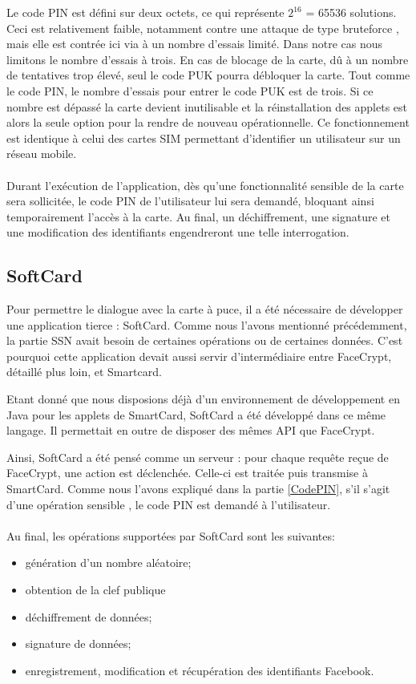 \documentclass[a4paper,11pt,french]{article}
\begin{document}
Le code PIN est défini sur deux octets, ce qui représente $2^{16}$ = 65536 solutions.
Ceci est relativement faible, notamment contre une attaque de type 
\og{}bruteforce \fg{}, mais elle est contrée ici via à un nombre d'essais limité.
Dans notre cas nous limitons le nombre d'essais à trois. En cas de blocage de la
carte, dû à un nombre de tentatives trop élevé, seul le code PUK pourra 
débloquer la carte. Tout comme le code PIN, le nombre d'essais pour entrer le 
code PUK est de trois. Si ce nombre est dépassé la carte devient inutilisable et
la réinstallation des applets est alors la seule option pour la rendre
de nouveau opérationnelle. Ce fonctionnement est identique à celui des cartes
 SIM permettant d'identifier un utilisateur sur un réseau mobile.

\paragraph{}
Durant l'exécution de l'application, dès qu'une fonctionnalité sensible de la 
carte sera sollicitée, le code PIN de l'utilisateur lui sera demandé, bloquant 
ainsi temporairement l'accès à la carte. Au final, un déchiffrement, une signature
et une modification des identifiants engendreront une telle interrogation.

\subsection{SoftCard}
Pour permettre le dialogue avec la carte à puce, il a été nécessaire de développer
une application tierce : SoftCard. Comme nous l'avons mentionné précédemment,
la partie SSN avait besoin de certaines opérations ou de certaines données. 
C'est pourquoi cette application devait aussi servir d'intermédiaire entre 
FaceCrypt, détaillé plus loin, et Smartcard.

Etant donné que nous disposions déjà d'un environnement de développement en Java
pour les applets de SmartCard, SoftCard a été développé dans ce même langage. Il
permettait en outre de disposer des mêmes API que FaceCrypt.

Ainsi, SoftCard a été pensé comme un serveur : pour chaque requête reçue de 
FaceCrypt, une action est déclenchée. Celle-ci est traitée puis transmise à
SmartCard. Comme nous l'avons expliqué dans la partie \ref{CodePIN}, s'il s'agit
d'une opération \og sensible \fg, le code PIN est demandé à l'utilisateur.

\paragraph{}
Au final, les opérations supportées par SoftCard sont les suivantes:  
\begin{itemize}
    \item génération d'un nombre aléatoire;
    \item obtention de la clef publique
    \item déchiffrement de données;
    \item signature de données;
    \item enregistrement, modification et récupération des identifiants Facebook.
\end{itemize}
\end{document}
